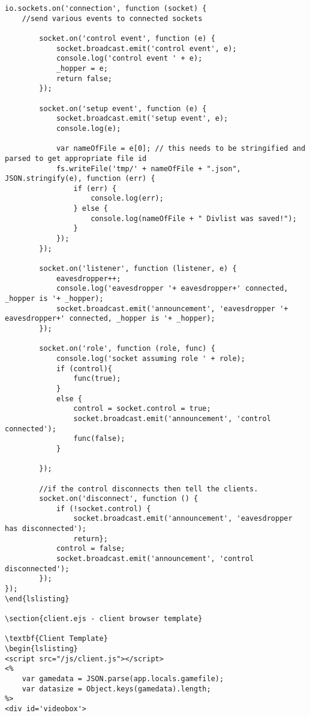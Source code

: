 \begin{lstlisting}
io.sockets.on('connection', function (socket) { 
    //send various events to connected sockets
				
        socket.on('control event', function (e) {
            socket.broadcast.emit('control event', e);
            console.log('control event ' + e);
            _hopper = e;
            return false;
        });

        socket.on('setup event', function (e) {
            socket.broadcast.emit('setup event', e);
            console.log(e);

            var nameOfFile = e[0]; // this needs to be stringified and parsed to get appropriate file id
            fs.writeFile('tmp/' + nameOfFile + ".json", JSON.stringify(e), function (err) {
                if (err) {
                    console.log(err);
                } else {
                    console.log(nameOfFile + " Divlist was saved!");
                }
            });
        });

		socket.on('listener', function (listener, e) {
			eavesdropper++;
			console.log('eavesdropper '+ eavesdropper+' connected, _hopper is '+ _hopper);
			socket.broadcast.emit('announcement', 'eavesdropper '+ eavesdropper+' connected, _hopper is '+ _hopper);
		});

        socket.on('role', function (role, func) {
            console.log('socket assuming role ' + role); 
            if (control){
             	func(true);
            }
			else {
                control = socket.control = true;
                socket.broadcast.emit('announcement', 'control connected');
                func(false);
            }
            
        });

        //if the control disconnects then tell the clients.
        socket.on('disconnect', function () {
            if (!socket.control) { 
                socket.broadcast.emit('announcement', 'eavesdropper has disconnected');
                return};
            control = false;
            socket.broadcast.emit('announcement', 'control disconnected');
        });
});
\end{lslisting}

\section{client.ejs - client browser template}

\textbf{Client Template}
\begin{lslisting}
<script src="/js/client.js"></script>
<% 
	var gamedata = JSON.parse(app.locals.gamefile);
	var datasize = Object.keys(gamedata).length;
%>
<div id='videobox'>
	

\end{lstlisting}
